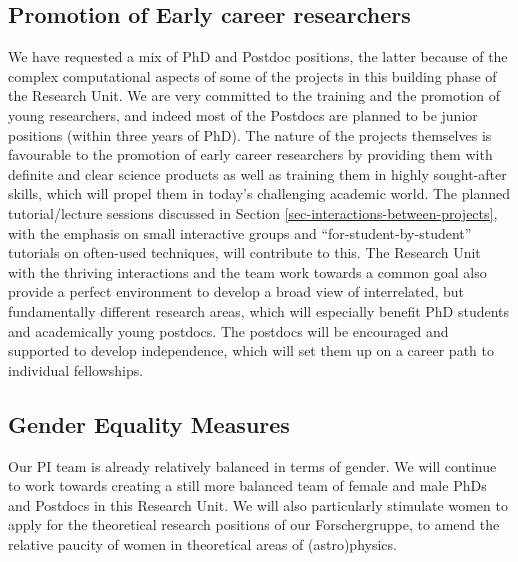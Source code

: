 \documentclass[10pt,fleqn,twoside,a4paper]{article}
\begin{document}
\subsection{Promotion of Early career researchers}

\noindent We have requested a mix of PhD and Postdoc positions, the
latter because of the complex computational aspects of some of the
projects in this building phase of the Research Unit. We are very
committed to the training and the promotion of young researchers, and
indeed most of the Postdocs are planned to be junior positions (within
three years of PhD). The nature of the projects themselves is
favourable to the promotion of early career researchers by providing
them with definite and clear science products as well as training them
in highly sought-after skills, which will propel them in today's
challenging academic world. The planned 
tutorial/lecture sessions discussed in Section 
\ref{sec-interactions-between-projects}, with the emphasis on small
interactive groups and ``for-student-by-student'' tutorials on often-used
techniques, will contribute to this. The Research Unit with the thriving
interactions and the team work towards a common goal also provide a
perfect environment to develop a broad view of interrelated, but
fundamentally different research areas, which will especially benefit
PhD students and academically young postdocs. The postdocs will be
encouraged and supported to develop independence, which will set them
up on a career path to individual fellowships. 

\subsection{Gender Equality Measures}

Our PI team is already relatively balanced in terms of gender. We will
continue to work towards creating a still
more balanced team of female and male PhDs and Postdocs in this
Research Unit. We will also particularly stimulate women to apply for the theoretical research positions of our Forschergruppe, to amend the relative paucity of women in theoretical areas of (astro)physics.

\end{document}
